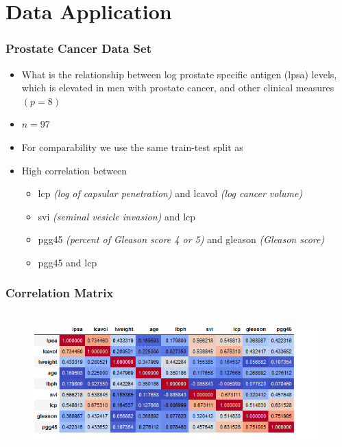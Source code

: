 \section{Data Application}%
\begin{frame}[fragile]
    \frametitle{Prostate Cancer Data Set}
    \begin{itemize}
        \item What is the relationship between log prostate specific antigen (lpsa) levels, which is elevated in men with prostate cancer, and other clinical measures $(p=8)$
        \item $n=97$
        \item For comparability we use the same train-test split as \cite{zou2005regularization}
        \item High correlation between
            \begin{itemize}
            \item lcp \textit{(log of capsular penetration)} and lcavol \textit{(log cancer volume)}
            \item svi \textit{(seminal vesicle invasion)} and lcp
            \item pgg45 \textit{(percent of Gleason score 4 or 5)} and gleason \textit{(Gleason score)}
            \item pgg45 and lcp
            \end{itemize}
    \end{itemize}
\end{frame}
\begin{frame}
\frametitle{Correlation Matrix}
    \begin{figure}
        \centering
        \includegraphics[width=11cm,height=5.5cm, left]{Img/corr_table.png}
    \end{figure}
\end{frame}
